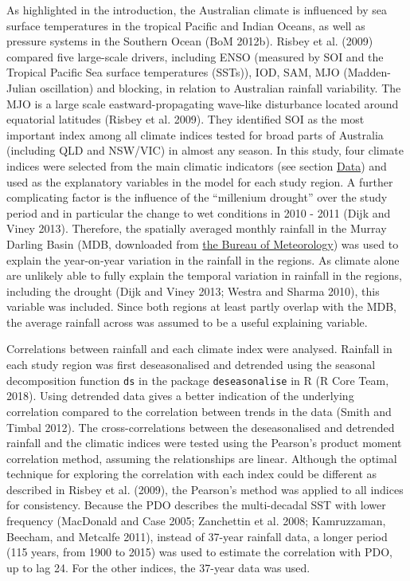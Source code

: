 \documentclass[fleqn,10pt,lineno]{wlpeerj} %
\begin{document}
As highlighted in the introduction, the Australian climate is influenced
by sea surface temperatures in the tropical Pacific and Indian Oceans,
as well as pressure systems in the Southern Ocean (BoM 2012b). Risbey et
al. (2009) compared five large-scale drivers, including ENSO (measured
by SOI and the Tropical Pacific Sea surface temperatures (SSTs)), IOD,
SAM, MJO (Madden-Julian oscillation) and blocking, in relation to
Australian rainfall variability. The MJO is a large scale
eastward-propagating wave-like disturbance located around equatorial
latitudes (Risbey et al. 2009). They identified SOI as the most
important index among all climate indices tested for broad parts of
Australia (including QLD and NSW/VIC) in almost any season. In this
study, four climate indices were selected from the main climatic
indicators (see section \protect\hyperlink{Data}{Data}) and used as the
explanatory variables in the model for each study region. A further
complicating factor is the influence of the ``millenium drought'' over
the study period and in particular the change to wet conditions in 2010
- 2011 (Dijk and Viney 2013). Therefore, the spatially averaged monthly
rainfall in the Murray Darling Basin (MDB, downloaded from
\href{http://www.bom.gov.au/web01/ncc/www/cli_chg/timeseries/rain/allmonths/mdb/latest.txt}{the
Bureau of Meteorology}) was used to explain the year-on-year variation
in the rainfall in the regions. As climate alone are unlikely able to
fully explain the temporal variation in rainfall in the regions,
including the drought (Dijk and Viney 2013; Westra and Sharma 2010),
this variable was included. Since both regions at least partly overlap
with the MDB, the average rainfall across was assumed to be a useful
explaining variable.

Correlations between rainfall and each climate index were analysed.
Rainfall in each study region was first deseasonalised and detrended
using the seasonal decomposition function \texttt{ds} in the package
\texttt{deseasonalise} in R (R Core Team, 2018). Using detrended data
gives a better indication of the underlying correlation compared to the
correlation between trends in the data (Smith and Timbal 2012). The
cross-correlations between the deseasonalised and detrended rainfall and
the climatic indices were tested using the Pearson's product moment
correlation method, assuming the relationships are linear. Although the
optimal technique for exploring the correlation with each index could be
different as described in Risbey et al. (2009), the Pearson's method was
applied to all indices for consistency. Because the PDO describes the
multi-decadal SST with lower frequency (MacDonald and Case 2005;
Zanchettin et al. 2008; Kamruzzaman, Beecham, and Metcalfe 2011),
instead of 37-year rainfall data, a longer period (115 years, from 1900
to 2015) was used to estimate the correlation with PDO, up to lag 24.
For the other indices, the 37-year data was used.
\end{document}
